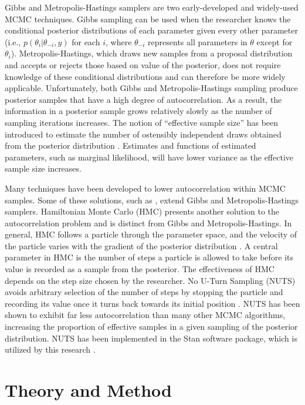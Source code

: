 \documentclass[twocolumn]{article}
\begin{document}
Gibbs and Metropolis-Hastings samplers are two early-developed and widely-used MCMC techniques. Gibbs sampling can be used when the researcher knows the conditional posterior distributions of each parameter given every other parameter (i.e., $p(\theta_i|\theta_{-i}, y)$ for each $i$, where $\theta_{-i}$ represents all parameters in $\theta$ except for $\theta_i$). Metropolis-Hastings, which draws new samples from a proposal distribution and accepts or rejects those based on value of the posterior, does not require knowledge of these conditional distributions and can therefore be more widely applicable. Unfortunately, both Gibbs and Metropolis-Hastings sampling produce posterior samples that have a high degree of autocorrelation. As a result, the information in a posterior sample grows relatively slowly as the number of sampling iterations increases. The notion of ``effective sample size'' has been introduced to estimate the number of ostensibly independent draws obtained from the posterior distribution \citep{Lenth}. Estimates and functions of estimated parameters, such as marginal likelihood, will have lower variance as the effective sample size increases.

Many techniques have been developed to lower autocorrelation within MCMC samples. Some of these solutions, such as \cite{Gilks}, extend Gibbs and Metropolis-Hastings samplers. Hamiltonian Monte Carlo (HMC) presents another solution to the autocorrelation problem and is distinct from Gibbs and Metropolis-Hastings. In general, HMC follows a particle through the parameter space, and the velocity of the particle varies with the gradient of the posterior distribution \citep{Girolami}. A central parameter in HMC is the number of steps a particle is allowed to take before its value is recorded as a sample from the posterior. The effectiveness of HMC depends on the step size chosen by the researcher. No U-Turn Sampling (NUTS) avoids arbitrary selection of the number of steps by stopping the particle and recording its value once it turns back towards its initial position \citep{NUTS}. NUTS has been shown to exhibit far less autocorrelation than many other MCMC algorithms, increasing the proportion of effective samples in a given sampling of the posterior distribution. NUTS has been implemented in the Stan software package, which is utilized by this research \citep{rstan}.

\section{Theory and Method}
\label{sec:Theory}
\end{document}

